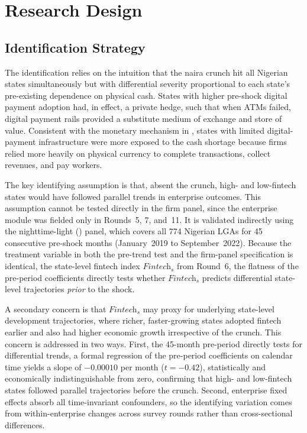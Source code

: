 
\section{Research Design}
\label{sec:design}

\subsection{Identification Strategy}
\label{sub:identification}

The identification relies on the intuition that the naira crunch hit all
Nigerian states simultaneously but with differential severity proportional to
each state's pre-existing dependence on physical cash. States with higher
pre-shock digital payment adoption had, in effect, a private hedge, such that when ATMs
failed, digital payment rails provided a substitute medium of exchange and
store of value. Consistent with the monetary mechanism in \citet{alvarez2022monetary}, states 
with limited digital-payment infrastructure were more exposed to the cash shortage because firms relied more heavily on 
physical currency to complete transactions, collect revenues, and pay workers.

The key identifying assumption is that, absent the crunch, high- and
low-fintech states would have followed parallel trends in enterprise outcomes.
This assumption cannot be tested directly in the firm panel, since the \NLPS{}
enterprise module was fielded only in Rounds~5, 7, and~11. It is validated
indirectly using the nighttime-light (\NTL{}) panel, which covers all 774
Nigerian LGAs for 45 consecutive pre-shock months (January~2019 to
September~2022). Because the treatment variable in both the \NTL{} pre-trend test and the
firm-panel specification is identical, the state-level fintech index
$\textit{Fintech}_s$ from \NLPS{} Round~6, the flatness of the pre-period
\NTL{} coefficients directly tests whether $\textit{Fintech}_s$ predicts
differential state-level trajectories \emph{prior} to the shock.

A secondary concern is that $\textit{Fintech}_s$ may proxy for underlying
state-level development trajectories, where richer, faster-growing states
adopted fintech earlier and also had higher economic growth irrespective of the
crunch. This concern is addressed in two ways. First, the 45-month \NTL{}
pre-period directly tests for differential trends, a formal regression of the
pre-period coefficients on calendar time yields a slope of $-0.00010$ per
month ($t = -0.42$), statistically and economically indistinguishable from
zero, confirming that high- and low-fintech states followed parallel
trajectories before the crunch. Second, enterprise fixed effects absorb all
time-invariant confounders, so the identifying variation comes from
within-enterprise changes across survey rounds rather than cross-sectional
differences.

